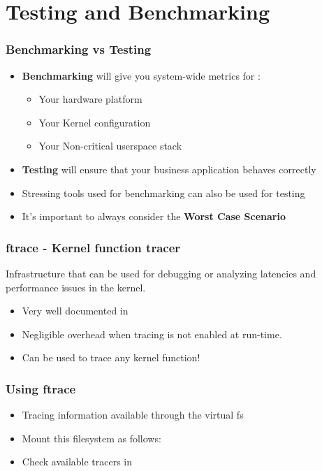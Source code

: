 \section{Testing and Benchmarking}

\begin{frame}
	\frametitle{Benchmarking vs Testing}
	\begin{itemize}
		\item \textbf{Benchmarking} will give you system-wide metrics for :
			\begin{itemize}
				\item Your hardware platform
				\item Your Kernel configuration
				\item Your Non-critical userspace stack
			\end{itemize}
		\item \textbf{Testing} will ensure that your business application behaves correctly
		\item Stressing tools used for benchmarking can also be used for testing
		\item It's important to always consider the \textbf{Worst Case Scenario}
	\end{itemize}
\end{frame}

\begin{frame}
  \frametitle{ftrace - Kernel function tracer}

  Infrastructure that can be used for debugging or analyzing latencies
  and performance issues in the kernel.

  \begin{itemize}
  \item Very well documented in 
  \item Negligible overhead when tracing is not enabled at run-time.
  \item Can be used to trace any kernel function!
  \end{itemize}
\end{frame}

\begin{frame}
  \frametitle{Using ftrace}
  \begin{itemize}
  \item Tracing information available through the  virtual fs
  \item Mount this filesystem as follows:\\
  \item Check available tracers in
  \end{itemize}
\end{frame}

